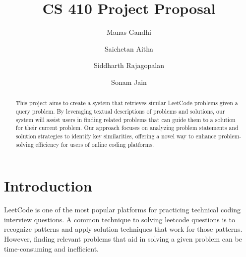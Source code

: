 \documentclass[sigconf]{acmart}
\begin{document}
\title{CS 410 Project Proposal}

\author{Manas Gandhi}

\author{Saichetan Aitha}

\author{Siddharth Rajagopalan}

\author{Sonam Jain}



\begin{abstract}
This project aims to create a system that retrieves similar LeetCode problems given a query problem. By leveraging textual descriptions of problems and solutions, our system will assist users in finding related problems that can guide them to a solution for their current problem. Our approach focuses on analyzing problem statements and solution strategies to identify key similarities, offering a novel way to enhance problem-solving efficiency for users of online coding platforms.
\end{abstract}

\maketitle

\section{Introduction}
LeetCode is one of the most popular platforms for practicing technical coding interview questions. A common technique to solving leetcode questions is to recognize patterns and apply solution techniques that work for those patterns. However, finding relevant problems that aid in solving a given problem can be time-consuming and inefficient. 
\end{document}

